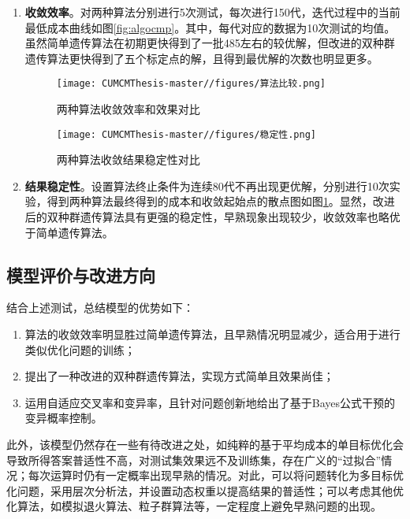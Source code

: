 \documentclass[withoutpreface,bwprint]{cumcmthesis} %
\begin{document}
\begin{enumerate}
    \item \textbf{收敛效率}。对两种算法分别进行5次测试，每次进行150代，迭代过程中的当前最低成本曲线如图\ref{fig:algocmp}。其中，每代对应的数据为10次测试的均值。虽然简单遗传算法在初期更快得到了一批485左右的较优解，但改进的双种群遗传算法更快得到了五个标定点的解，且得到最优解的次数也明显更多。
    \begin{figure}[htbp]
        \centering
        \begin{minipage}[t]{0.49\linewidth}
            \centering
            \texttt{[image: CUMCMThesis-master//figures/算法比较.png]}
            \caption{两种算法收敛效率和效果对比}
            \label{fig:algocmp}
        \end{minipage}
        \begin{minipage}[t]{0.49\linewidth}
            \centering
            \texttt{[image: CUMCMThesis-master//figures/稳定性.png]}
            \caption{两种算法收敛结果稳定性对比}
            \label{fig:algocmp1}
        \end{minipage}
    \end{figure}
    \item \textbf{结果稳定性}。设置算法终止条件为连续80代不再出现更优解，分别进行10次实验，得到两种算法最终得到的成本和收敛起始点的散点图如图\ref{fig:algocmp1}。显然，改进后的双种群遗传算法具有更强的稳定性，早熟现象出现较少，收敛效率也略优于简单遗传算法。
\end{enumerate}

\subsection{模型评价与改进方向}

结合上述测试，总结模型的优势如下：
\begin{enumerate}
    \item 算法的收敛效率明显胜过简单遗传算法，且早熟情况明显减少，适合用于进行类似优化问题的训练；
    \item 提出了一种改进的双种群遗传算法，实现方式简单且效果尚佳；
    \item 运用自适应交叉率和变异率，且针对问题创新地给出了基于Bayes公式干预的变异概率控制。
\end{enumerate}

此外，该模型仍然存在一些有待改进之处，如纯粹的基于平均成本的单目标优化会导致所得答案普适性不高，对测试集效果远不及训练集，存在广义的“过拟合”情况；每次运算时仍有一定概率出现早熟的情况。对此，可以将问题转化为多目标优化问题，采用层次分析法，并设置动态权重以提高结果的普适性；可以考虑其他优化算法，如模拟退火算法、粒子群算法等，一定程度上避免早熟问题的出现。
\end{document}
